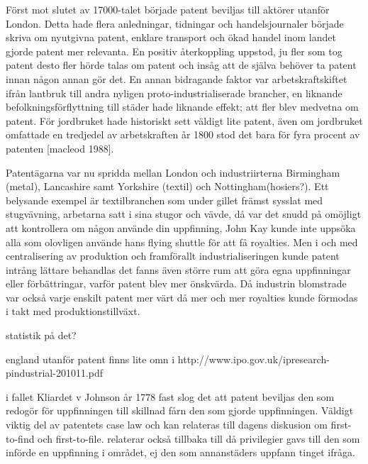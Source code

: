 Först mot slutet av 17000-talet började patent beviljas till aktörer utanför London. Detta hade flera anledningar, tidningar och handelsjournaler började skriva om nyutgivna patent, enklare transport och ökad handel inom landet gjorde patent mer relevanta. En positiv återkoppling uppstod, ju fler som tog patent desto fler hörde talas om patent och insåg att de själva behöver ta patent innan någon annan gör det. En annan bidragande faktor var arbetskraftskiftet ifrån lantbruk till andra nyligen proto-industrialiserade brancher, en liknande befolkningsförflyttning till städer hade liknande effekt; att fler blev medvetna om patent. För jordbruket hade historiskt sett väldigt lite patent, även om jordbruket omfattade en tredjedel av arbetskraften år 1800 stod det bara för fyra procent av patenten [macleod 1988].

Patentägarna var nu spridda mellan London och industriirterna Birmingham (metal), Lancashire samt Yorkshire (textil) och Nottingham(hosiers?). Ett belysande exempel är textilbranchen som under gillet främst sysslat med stugvävning, arbetarna satt i sina stugor och vävde, då var det snudd på omöjligt att kontrollera om någon använde din uppfinning, John Kay kunde inte uppsöka alla som olovligen använde hans flying shuttle för att få royalties. Men i och med centralisering av produktion och framförallt industrialiseringen kunde patent intrång lättare behandlas det fanns även större rum att göra egna uppfinningar eller förbättringar, varför patent blev mer önskvärda. Då industrin blomstrade var också varje enskilt patent mer värt då mer och mer royalties kunde förmodas i takt med produktionstillväxt.

statistik på det? 

england utanför patent finns lite omn i http://www.ipo.gov.uk/ipresearch-pindustrial-201011.pdf

i fallet Kliardet v Johnson år 1778 fast slog det att patent beviljas den som redogör för uppfinningen till skillnad fårn den som gjorde uppfinningen. Väldigt viktig del av patentets case law och kan relateras till dagens diskusion om first-to-find och first-to-file. relaterar också tillbaka till då privilegier gavs till den som införde en uppfinning i området, ej den som annanstäders uppfann tinget ifråga.


